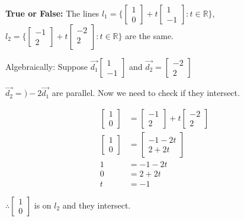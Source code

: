 \documentclass[11pt]{article}
\theoremstyle{plain}
\theoremstyle{remark}
\theoremstyle{plain}
\newcommand{\bd}{\textbf}
\newcommand{\rn}{\mathbb{R}}
\begin{document}
\begin{tcolorbox}[colback=magenta!5!white,colframe=magenta!75!black,title=Problem 4]
    \bd{True or False:} The lines $l_1=\{\begin{bmatrix}
        1\\0
    \end{bmatrix}+t\begin{bmatrix}
        1\\-1
    \end{bmatrix}:t\in\rn\}$, $l_2=\{\begin{bmatrix}
        -1\\2
    \end{bmatrix}+t\begin{bmatrix}
        -2\\2\\
    \end{bmatrix}:t\in\rn\}$ are the same.
 
    Algebraically:
    Suppose $\overrightarrow{d_1}\begin{bmatrix}
        1\\-1
    \end{bmatrix}$ and $\overrightarrow{d_2}=\begin{bmatrix}
        -2\\2
    \end{bmatrix}$

    $\overrightarrow{d_2}=)-2\overrightarrow{d_1}$ are parallel. Now we need to check 
    if they intersect.
    
    \begin{align*}
        \begin{bmatrix}
            1\\0
        \end{bmatrix}&=\begin{bmatrix}
            -1\\2
        \end{bmatrix}+t\begin{bmatrix}
            -2\\2
        \end{bmatrix}\\
        \begin{bmatrix}
            1\\0
        \end{bmatrix}&=\begin{bmatrix}
            -1-2t\\2+2t
        \end{bmatrix}\\
        1&=-1-2t\\
        0&=2+2t\\
        t&=-1
    \end{align*}

    $\therefore\begin{bmatrix}
        1\\0
    \end{bmatrix}$ is on $l_2$ and they intersect.
 \end{tcolorbox}  
\end{document}
